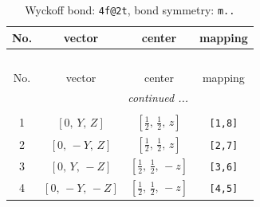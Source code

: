 \documentclass[fleqn,8pt]{jsarticle}
\begin{document}
\renewcommand{\arraystretch}{1.2}
\begin{longtable}{cccc}
\caption{Wyckoff bond: {\tt 4f@2t}, bond symmetry: {\tt m..}}
 \\
 \hline \hline
No. & vector & center & mapping \\ \hline \endfirsthead

\multicolumn{3}{l}{\tablename\ \thetable{}} \\
 \hline \hline
No. & vector & center & mapping \\ \hline \endhead

 \hline \hline
\multicolumn{3}{r}{\footnotesize\it continued ...} \\ \endfoot

 \hline \hline
\multicolumn{3}{r}{} \\ \endlastfoot

1 & $\left[ 0,\, Y,\, Z \right]$ & $\left[ \frac{1}{2},\, \frac{1}{2},\, z \right]$ & {\tt [1,8]} \\ \hline
2 & $\left[ 0,\, - Y,\, Z \right]$ & $\left[ \frac{1}{2},\, \frac{1}{2},\, z \right]$ & {\tt [2,7]} \\ \hline
3 & $\left[ 0,\, Y,\, - Z \right]$ & $\left[ \frac{1}{2},\, \frac{1}{2},\, - z \right]$ & {\tt [3,6]} \\ \hline
4 & $\left[ 0,\, - Y,\, - Z \right]$ & $\left[ \frac{1}{2},\, \frac{1}{2},\, - z \right]$ & {\tt [4,5]} \\
\end{longtable}
\renewcommand{\arraystretch}{1.2}
\end{document}
